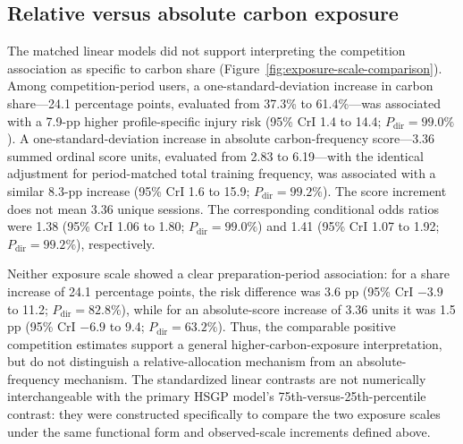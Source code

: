 \subsection{Relative versus absolute carbon exposure}
\label{sec:results-exposure-scale}
The matched linear models did not support interpreting the competition association as specific to carbon share (Figure~\ref{fig:exposure-scale-comparison}). Among competition-period users, a one-standard-deviation increase in carbon share---24.1 percentage points, evaluated from 37.3\% to 61.4\%---was associated with a 7.9-pp higher profile-specific injury risk (95\% CrI 1.4 to 14.4; $P_{\mathrm{dir}}=99.0\%$). A one-standard-deviation increase in absolute carbon-frequency score---3.36 summed ordinal score units, evaluated from 2.83 to 6.19---with the identical adjustment for period-matched total training frequency, was associated with a similar 8.3-pp increase (95\% CrI 1.6 to 15.9; $P_{\mathrm{dir}}=99.2\%$). The score increment does not mean 3.36 unique sessions. The corresponding conditional odds ratios were 1.38 (95\% CrI 1.06 to 1.80; $P_{\mathrm{dir}}=99.0\%$) and 1.41 (95\% CrI 1.07 to 1.92; $P_{\mathrm{dir}}=99.2\%$), respectively.

Neither exposure scale showed a clear preparation-period association: for a share increase of 24.1 percentage points, the risk difference was 3.6 pp (95\% CrI $-3.9$ to 11.2; $P_{\mathrm{dir}}=82.8\%$), while for an absolute-score increase of 3.36 units it was 1.5 pp (95\% CrI $-6.9$ to 9.4; $P_{\mathrm{dir}}=63.2\%$). Thus, the comparable positive competition estimates support a general higher-carbon-exposure interpretation, but do not distinguish a relative-allocation mechanism from an absolute-frequency mechanism. The standardized linear contrasts are not numerically interchangeable with the primary HSGP model's 75th-versus-25th-percentile contrast: they were constructed specifically to compare the two exposure scales under the same functional form and observed-scale increments defined above.


